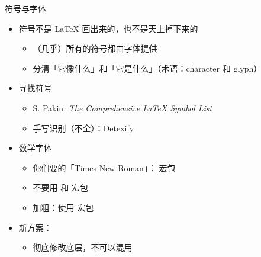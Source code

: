 \begin{frame}{符号与字体}
\begin{itemize}
  \item 符号不是 \LaTeX{} 画出来的，也不是天上掉下来的 \pause
    \begin{itemize}
      \item （几乎）所有的符号都由字体提供 \pause
      \item 分清「它像什么」和「它是什么」（术语：character 和 glyph）
    \end{itemize} \pause
  \item 寻找符号
    \begin{itemize}
      \item S. Pakin. \emph{The Comprehensive \LaTeX{} Symbol List}
      \item 手写识别（不全）：Detexify 
    \end{itemize} \pause
  \item 数学字体
    \begin{itemize}
      \item 你们要的「Times New Roman」： 宏包
      \item \alert{不要用  和  宏包}
      \item 加粗：使用  宏包
    \end{itemize} \pause
  \item 新方案：
    \begin{itemize}
      \item 彻底修改底层，不可以混用
    \end{itemize}
\end{itemize}
\end{frame}

